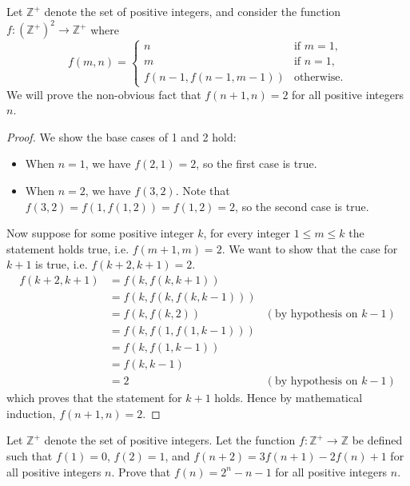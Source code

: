 \begin{example}
    Let $\mathbb{Z}^+$ denote the set of positive integers, and consider the function $f: \left(\mathbb{Z}^+\right)^2\to\mathbb{Z}^+$ where
    \[
        f(m, n) =
        \begin{cases}
            n & \text{if } m = 1, \\
            m & \text{if } n = 1, \\
            f\left(n-1,f(n-1,m-1)\right) & \text{otherwise.}
        \end{cases}
    \]
    We will prove the non-obvious fact that $f(n+1, n) = 2$ for all positive integers $n$.
    \begin{proof}
        We show the base cases of 1 and 2 hold:
        \begin{itemize}
            \item When $n = 1$, we have $f(2, 1) = 2$, so the first case is true.
            \item When $n = 2$, we have $f(3, 2)$. Note that $f(3,2) = f(1, f(1, 2)) = f(1, 2) = 2$, so the second case is true.
        \end{itemize}
        
        Now suppose for some positive integer $k$, for every integer $1 \leq m \leq k$ the statement holds true, i.e. $f(m+1,m) = 2$. We want to show that the case for $k+1$ is true, i.e. $f(k+2, k+1) = 2$.
        \begin{align*}
            f(k+2, k+1) &= f(k, f(k, k+1))\\
            &= f(k, f(k, f(k, k-1)))\\
            &= f(k, f(k, 2)) & (\text{by hypothesis on } k-1)\\
            &= f(k, f(1, f(1, k-1)))\\
            &= f(k, f(1, k-1))\\
            &= f(k, k-1) \\
            &= 2 & (\text{by hypothesis on } k-1)
        \end{align*}
        which proves that the statement for $k+1$ holds. Hence by mathematical induction, $f(n+1, n) = 2$.
    \end{proof}
\end{example}

\begin{exercise}
    Let $\mathbb{Z}^+$ denote the set of positive integers. Let the function $f: \mathbb{Z}^+ \to \mathbb{Z}$ be defined such that $f(1) = 0$, $f(2) = 1$, and $f(n+2) = 3f(n+1) - 2f(n) + 1$ for all positive integers $n$. Prove that $f(n) = 2^n - n - 1$ for all positive integers $n$.
\end{exercise}

